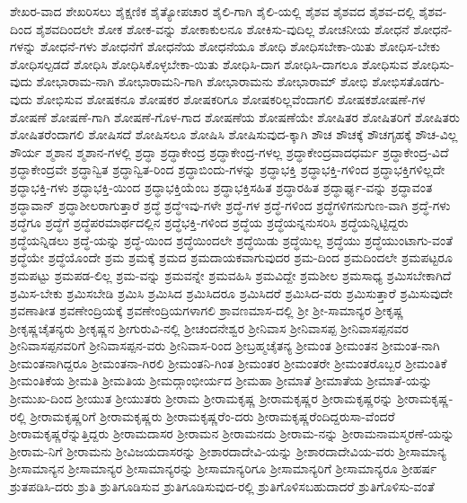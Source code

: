 {ಶೇಖರ-ವಾದ
ಶೇಖರಿಸಲು
ಶೈಕ್ಷಣಿಕ
ಶೈತ್ಯೋಪಚಾರ
ಶೈಲಿ-ಗಾಗಿ
ಶೈಲಿ-ಯಲ್ಲಿ
ಶೈಶವ
ಶೈಶವದ
ಶೈಶವ-ದಲ್ಲಿ
ಶೈಶವ-ದಿಂದ
ಶೈಶವದಿಂದಲೇ
ಶೋಕ
ಶೋಕ-ವನ್ನು
ಶೋಕಾಕುಲನೂ
ಶೋಕಿಸು-ವುದಿಲ್ಲ
ಶೋಚನೀಯ
ಶೋಧನೆ
ಶೋಧನೆ-ಗಳನ್ನು
ಶೋಧನೆ-ಗಳು
ಶೋಧನೆಗೆ
ಶೋಧನೆಯ
ಶೋಧನೆಯೂ
ಶೋಧಿ
ಶೋಧಿಸಬೇಕಾ-ಯಿತು
ಶೋಧಿಸ-ಬೇಕು
ಶೋಧಿಸಲ್ಪಡದೆ
ಶೋಧಿಸಿ
ಶೋಧಿಸಿಕೊಳ್ಳಬೇಕಾ-ಯಿತು
ಶೋಧಿಸಿ-ದಾಗ
ಶೋಧಿಸಿ-ದಾಗಲೂ
ಶೋಧಿಸುವ
ಶೋಧಿಸು-ವುದು
ಶೋಭಾರಾಮ-ನಾಗಿ
ಶೋಭಾರಾಮನಿ-ಗಾಗಿ
ಶೋಭಾರಾಮನು
ಶೋಭಾರಾಮ್
ಶೋಭಿ
ಶೋಭಿಸತೊಡಗು-ವುದು
ಶೋಭಿಸುವ
ಶೋಷಕನೂ
ಶೋಷಕರ
ಶೋಷಕರಿಗೂ
ಶೋಷಕರಿಲ್ಲವೆಂದಾಗಲಿ
ಶೋಷಕಶೋಷಣೆ-ಗಳ
ಶೋಷಣೆ
ಶೋಷಣೆ-ಗಾಗಿ
ಶೋಷಣೆ-ಗೊಳ-ಗಾದ
ಶೋಷಣೆಯ
ಶೋಷಣೆಯೇ
ಶೋಷಿತರ
ಶೋಷಿತರಿಗೆ
ಶೋಷಿತರು
ಶೋಷಿತರೆಂದಾಗಲಿ
ಶೋಷಿಸದೆ
ಶೋಷಿಸಲೂ
ಶೋಷಿಸಿ
ಶೋಷಿಸುವುದ-ಕ್ಕಾಗಿ
ಶೌಚ
ಶೌಚಕ್ಕೆ
ಶೌಚಗೃಹಕ್ಕೆ
ಶೌಚ-ವಿಲ್ಲ
ಶೌರ್ಯ
ಶ್ಮಶಾನ
ಶ್ಮಶಾನ-ಗಳಲ್ಲಿ
ಶ್ರದ್ಧಾ
ಶ್ರದ್ಧಾಕೇಂದ್ರ
ಶ್ರದ್ಧಾಕೇಂದ್ರ-ಗಳಲ್ಲ
ಶ್ರದ್ಧಾಕೇಂದ್ರವಾದಧರ್ಮ
ಶ್ರದ್ಧಾಕೇಂದ್ರ-ವಿದೆ
ಶ್ರದ್ಧಾಕೇಂದ್ರವೇ
ಶ್ರದ್ಧಾನ್ವಿತ
ಶ್ರದ್ಧಾನ್ವಿತ-ರಿಂದ
ಶ್ರದ್ಧಾಬಿಂದು-ಗಳನ್ನು
ಶ್ರದ್ಧಾಭಕ್ತಿ
ಶ್ರದ್ಧಾಭಕ್ತಿ-ಗಳಿಂದ
ಶ್ರದ್ಧಾಭಕ್ತಿಗಳಿಲ್ಲದೇ
ಶ್ರದ್ಧಾಭಕ್ತಿ-ಗಳು
ಶ್ರದ್ಧಾಭಕ್ತಿ-ಯಿಂದ
ಶ್ರದ್ಧಾಭಕ್ತಿಯೆಂಬ
ಶ್ರದ್ಧಾಭಕ್ತಿಸಹಿತ
ಶ್ರದ್ಧಾರಹಿತ
ಶ್ರದ್ಧಾರ್ಘ್ಯ-ವನ್ನು
ಶ್ರದ್ಧಾವಂತ
ಶ್ರದ್ಧಾವಾನ್
ಶ್ರದ್ಧಾಶೀಲರಾಗುತ್ತಾರೆ
ಶ್ರದ್ಧೆ
ಶ್ರದ್ಧೆಇವು-ಗಳೇ
ಶ್ರದ್ಧೆ-ಗಳ
ಶ್ರದ್ಧೆ-ಗಳಿಂದ
ಶ್ರದ್ಧೆಗಳಿಗನುಗುಣ-ವಾಗಿ
ಶ್ರದ್ಧೆ-ಗಳು
ಶ್ರದ್ಧೆಗೂ
ಶ್ರದ್ಧೆಗೆ
ಶ್ರದ್ಧೆಪರಮಾರ್ಥದಲ್ಲಿನ
ಶ್ರದ್ಧೆಭಕ್ತಿ-ಗಳಿಂದ
ಶ್ರದ್ಧೆಯ
ಶ್ರದ್ಧೆಯನ್ನನುಸರಿಸಿ
ಶ್ರದ್ಧೆಯನ್ನಿಟ್ಟಿದ್ದರು
ಶ್ರದ್ಧೆಯನ್ನಿಡಲು
ಶ್ರದ್ಧೆ-ಯನ್ನು
ಶ್ರದ್ಧೆ-ಯಿಂದ
ಶ್ರದ್ಧೆಯಿಂದಲೇ
ಶ್ರದ್ಧೆಯಿಡು
ಶ್ರದ್ಧೆಯಿಲ್ಲ
ಶ್ರದ್ಧೆಯು
ಶ್ರದ್ಧೆಯುಂಟಾಗು-ವಂತೆ
ಶ್ರದ್ಧೆಯೇ
ಶ್ರದ್ಧೆಯೊಂದೇ
ಶ್ರಮ
ಶ್ರಮಕ್ಕೆ
ಶ್ರಮದ
ಶ್ರಮದಾಯಕವಾಗುವುದರ
ಶ್ರಮ-ದಿಂದ
ಶ್ರಮದಿಂದಲೇ
ಶ್ರಮಪಟ್ಟರೂ
ಶ್ರಮಪಟ್ಟು
ಶ್ರಮಪಡ-ಲಿಲ್ಲ
ಶ್ರಮ-ವನ್ನು
ಶ್ರಮವನ್ನೇ
ಶ್ರಮವಹಿಸಿ
ಶ್ರಮವಿದ್ದೇ
ಶ್ರಮಶೀಲ
ಶ್ರಮಸಾಧ್ಯ
ಶ್ರಮಿಸಬೇಕಾಗಿದೆ
ಶ್ರಮಿಸ-ಬೇಕು
ಶ್ರಮಿಸಬೇಡಿ
ಶ್ರಮಿಸಿ
ಶ್ರಮಿಸಿದ
ಶ್ರಮಿಸಿದರೂ
ಶ್ರಮಿಸಿದರೆ
ಶ್ರಮಿಸಿದ-ವರು
ಶ್ರಮಿಸುತ್ತಾರೆ
ಶ್ರಮಿಸುವುದೇ
ಶ್ರವಣಾತೀತ
ಶ್ರವಣೇಂದ್ರಿಯಕ್ಕೆ
ಶ್ರವಣೇಂದ್ರಿಯಗಳಾಗಲಿ
ಶ್ರಾವಣಮಾಸ-ದಲ್ಲಿ
ಶ್ರೀ
ಶ್ರೀ-ಸಾಮಾನ್ಯರ
ಶ್ರೀಕೃಷ್ಣ
ಶ್ರೀಕೃಷ್ಣಚೈತನ್ಯರು
ಶ್ರೀಕೃಷ್ಣನ
ಶ್ರೀಗುರುವಿ-ನಲ್ಲಿ
ಶ್ರೀಚಂದನೇಶ್ವರ
ಶ್ರೀನಿವಾಸ
ಶ್ರೀನಿವಾಸಪ್ಪ
ಶ್ರೀನಿವಾಸಪ್ಪನವರ
ಶ್ರೀನಿವಾಸಪ್ಪನವರಿಗೆ
ಶ್ರೀನಿವಾಸಪ್ಪನ-ವರು
ಶ್ರೀನಿವಾಸ-ರಿಂದ
ಶ್ರೀಬ್ರಹ್ಮಚೈತನ್ಯ
ಶ್ರೀಮಂತ
ಶ್ರೀಮಂತನ
ಶ್ರೀಮಂತ-ನಾಗಿ
ಶ್ರೀಮಂತನಾಗಿದ್ದರೂ
ಶ್ರೀಮಂತನಾ-ಗಿರಲಿ
ಶ್ರೀಮಂತನಿ-ಗಿಂತ
ಶ್ರೀಮಂತರ
ಶ್ರೀಮಂತರೇ
ಶ್ರೀಮಂತರೊಬ್ಬರ
ಶ್ರೀಮಂತಿಕೆ
ಶ್ರೀಮಂತಿಕೆಯ
ಶ್ರೀಮತಿ
ಶ್ರೀಮತಿಯ
ಶ್ರೀಮದ್ಗಾಂಭೀರ್ಯದ
ಶ್ರೀಮಹಾ
ಶ್ರೀಮಾತೆ
ಶ್ರೀಮಾತೆಯ
ಶ್ರೀಮಾತೆ-ಯನ್ನು
ಶ್ರೀಮುಖ-ದಿಂದ
ಶ್ರೀಯುತ
ಶ್ರೀಯುತರು
ಶ್ರೀರಾಮ
ಶ್ರೀರಾಮಕೃಷ್ಣ
ಶ್ರೀರಾಮಕೃಷ್ಣರ
ಶ್ರೀರಾಮಕೃಷ್ಣರನ್ನು
ಶ್ರೀರಾಮಕೃಷ್ಣ-ರಲ್ಲಿ
ಶ್ರೀರಾಮಕೃಷ್ಣರಿಗೆ
ಶ್ರೀರಾಮಕೃಷ್ಣರು
ಶ್ರೀರಾಮಕೃಷ್ಣರೆಂ-ದರು
ಶ್ರೀರಾಮಕೃಷ್ಣರೆಂದಿದ್ದರುಸಾ-ವೆಂದರೆ
ಶ್ರೀರಾಮಕೃಷ್ಣರೆನ್ನುತ್ತಿದ್ದರು
ಶ್ರೀರಾಮದಾಸರ
ಶ್ರೀರಾಮನ
ಶ್ರೀರಾಮನದು
ಶ್ರೀರಾಮ-ನನ್ನು
ಶ್ರೀರಾಮನಾಮಸ್ಮರಣೆ-ಯನ್ನು
ಶ್ರೀರಾಮ-ನಿಗೆ
ಶ್ರೀರಾಮನು
ಶ್ರೀವಿಜಯದಾಸರನ್ನು
ಶ್ರೀಶಾರದಾದೇವಿ-ಯನ್ನು
ಶ್ರೀಶಾರದಾದೇವಿಯ-ವರು
ಶ್ರೀಸಾಮಾನ್ಯ
ಶ್ರೀಸಾಮಾನ್ಯನ
ಶ್ರೀಸಾಮಾನ್ಯರ
ಶ್ರೀಸಾಮಾನ್ಯರನ್ನು
ಶ್ರೀಸಾಮಾನ್ಯರಿಗೂ
ಶ್ರೀಸಾಮಾನ್ಯರಿಗೆ
ಶ್ರೀಸಾಮಾನ್ಯರೂ
ಶ್ರೀಹರ್ಷ
ಶ್ರುತಪಡಿಸಿ-ದರು
ಶ್ರುತಿ
ಶ್ರುತಿಗೂಡಿಸುವ
ಶ್ರುತಿಗೂಡಿಸುವುದ-ರಲ್ಲಿ
ಶ್ರುತಿಗೊಳಿಸಬಹುದಾದರೆ
ಶ್ರುತಿಗೊಳಿಸು-ವಂತೆ
}
